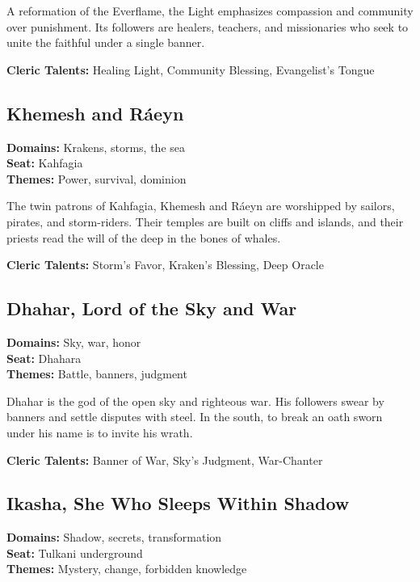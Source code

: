 A reformation of the Everflame, the Light emphasizes compassion and community over punishment. Its followers are healers, teachers, and missionaries who seek to unite the faithful under a single banner.

\textbf{Cleric Talents:} Healing Light, Community Blessing, Evangelist's Tongue

\subsection*{Khemesh and Ráeyn}

\textbf{Domains:} Krakens, storms, the sea \\
\textbf{Seat:} Kahfagia \\
\textbf{Themes:} Power, survival, dominion

The twin patrons of Kahfagia, Khemesh and Ráeyn are worshipped by sailors, pirates, and storm-riders. Their temples are built on cliffs and islands, and their priests read the will of the deep in the bones of whales.

\textbf{Cleric Talents:} Storm's Favor, Kraken's Blessing, Deep Oracle

\subsection*{Dhahar, Lord of the Sky and War}

\textbf{Domains:} Sky, war, honor \\
\textbf{Seat:} Dhahara \\
\textbf{Themes:} Battle, banners, judgment

Dhahar is the god of the open sky and righteous war. His followers swear by banners and settle disputes with steel. In the south, to break an oath sworn under his name is to invite his wrath.

\textbf{Cleric Talents:} Banner of War, Sky's Judgment, War-Chanter

\subsection*{Ikasha, She Who Sleeps Within Shadow}

\textbf{Domains:} Shadow, secrets, transformation \\
\textbf{Seat:} Tulkani underground \\
\textbf{Themes:} Mystery, change, forbidden knowledge

